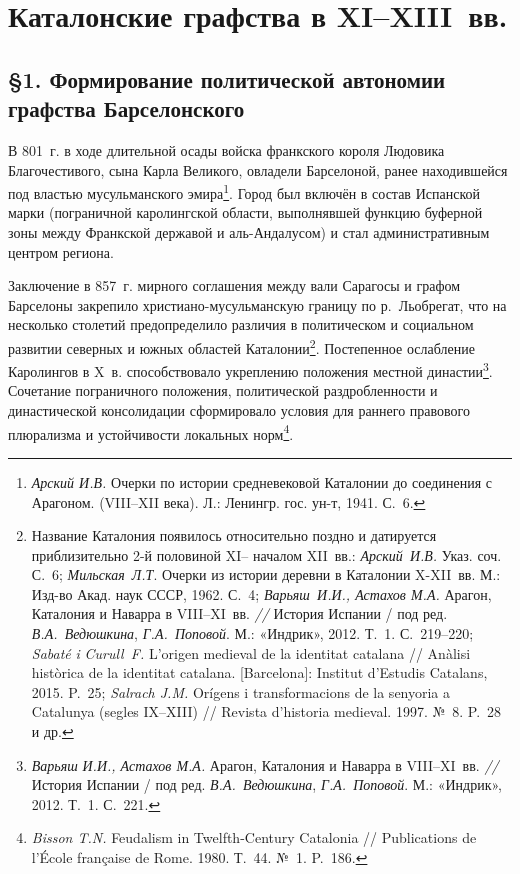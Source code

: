
\chapter*{Каталонские графства в XI--XIII~вв.}

\section*{§1. Формирование политической автономии графства Барселонского}

В 801~г. в ходе длительной осады войска франкского короля Людовика Благочестивого, сына Карла Великого, овладели Барселоной, ранее находившейся под властью мусульманского эмира\footnote{\emph{Арский И.В. }Очерки по истории средневековой Каталонии до соединения с Арагоном. (VIII--XII века). Л.: Ленингр. гос. ун-т, 1941. С.~6.}. Город был включён в состав Испанской марки (пограничной каролингской области, выполнявшей функцию буферной зоны между Франкской державой и аль-Андалусом) и стал административным центром региона.

Заключение в 857~г. мирного соглашения между вали Сарагосы и графом Барселоны закрепило христиано-мусульманскую границу по р.~Льобрегат, что на несколько столетий предопределило различия в политическом и социальном развитии северных и южных областей Каталонии\footnote{Название Каталония появилось относительно поздно и датируется приблизительно 2-й половиной XI-- началом XII~вв.: \emph{Арский~И.В.} Указ. соч. С.~6; \emph{Мильская}\emph{~Л.Т}. Очерки из истории деревни в Каталонии X-XII~вв. М.: Изд-во Акад. наук СССР, 1962. С.~4; \emph{Варьяш}\emph{~}\emph{И.И., Астахов М.А.} Арагон, Каталония и Наварра в VIII--XI~вв. \emph{// }История Испании / под ред. \emph{В.А.~Ведюшкина}, \emph{Г.А.~Поповой}. М.: «Индрик», 2012. Т.~1. С.~219--220; \emph{Sabat}\emph{é }\emph{i}\emph{ }\emph{Curull}\emph{~}\emph{F}\emph{.} L’origen medieval de la identitat catalana // Anàlisi històrica de la identitat catalana. [Barcelona]: Institut d’Estudis Catalans, 2015. P.~25; \emph{Salrach J.M.} Orígens i transformacions de la senyoria a Catalunya (segles IX--XIII) // Revista d’historia medieval. 1997. №~8. P.~28 и др.}. Постепенное ослабление Каролингов в X~в. способствовало укреплению положения местной династии\footnote{\emph{Варьяш}\emph{ И.И., Астахов М.А.} Арагон, Каталония и Наварра в VIII--XI~вв. \emph{// }История Испании / под ред. \emph{В.А.~Ведюшкина}, \emph{Г.А.~Поповой}. М.: «Индрик», 2012. Т.~1. С.~221.}. Сочетание пограничного положения, политической раздробленности и династической консолидации сформировало условия для раннего правового плюрализма и устойчивости локальных норм\footnote{\emph{Bisson T.N.} Feudalism in Twelfth-Century Catalonia // Publications de l’École française de Rome. 1980. Т.~44. №~1. P.~186.}.

